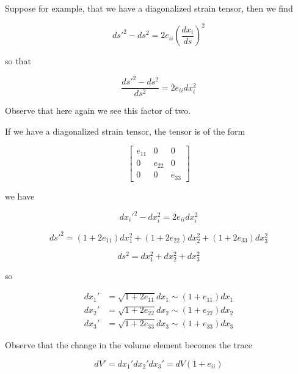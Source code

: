 Suppose for example, that we have a diagonalized strain tensor, then we find

\begin{equation}\label{eqn:continuumL3:70}
{ds'}^2 - ds^2 
= 2 e_{ii} \left(\frac{dx_i}{ds}\right)^2
\end{equation}

so that

\begin{equation}\label{eqn:continuumL3:90}
\frac{
{ds'}^2 - ds^2 
}{ds^2}
= 2 e_{ii} dx_i^2
\end{equation}

Observe that here again we see this factor of two.

If we have a diagonalized strain tensor, the tensor is of the form

\begin{equation}\label{eqn:continuumL3:110}
\begin{bmatrix}
e_{11} & 0 & 0 \\
0 & e_{22} & 0 \\
0 & 0 & e_{33} 
\end{bmatrix}
\end{equation}

we have

\begin{equation}\label{eqn:continuumL3:130}
{dx_i'}^2 - dx_i^2 = 2 e_{ii} dx_i^2
\end{equation}

\begin{equation}\label{eqn:continuumL3:150}
{ds'}^2 = 
(1 + 2 e_{11}) dx_1^2
+(1 + 2 e_{22}) dx_2^2
+(1 + 2 e_{33}) dx_3^2
\end{equation}

\begin{equation}\label{eqn:continuumL3:170}
ds^2 = 
dx_1^2
+dx_2^2
+dx_3^2
\end{equation}

so 

\begin{align}\label{eqn:continuumL3:190}
dx_1' &= \sqrt{1 + 2 e_{11}} dx_1 \sim ( 1 + e_{11}) dx_1 \\
dx_2' &= \sqrt{1 + 2 e_{22}} dx_2 \sim ( 1 + e_{22}) dx_2 \\
dx_3' &= \sqrt{1 + 2 e_{33}} dx_3 \sim ( 1 + e_{33}) dx_3
\end{align}

Observe that the change in the volume element becomes the trace

\begin{equation}\label{eqn:continuumL3:210}
dV' = 
dx_1'
dx_2'
dx_3'
= dV(1 + e_{ii})
\end{equation}

